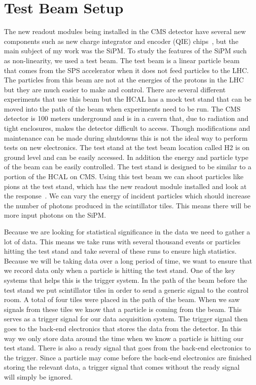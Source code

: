 \section{Test Beam Setup}


The new readout modules being installed in the CMS detector have several new components such as new charge integrator and encoder (QIE) chips~\cite{QIE, QIE2}, but the main subject of my work was the SiPM. To study the features of the SiPM such as non-linearity, we used a test beam. The test beam is a linear particle beam that comes from the SPS accelerator when it does not feed particles to the LHC. The particles from this beam are not at the energies of the protons in the LHC but they are much easier to make and control. There are several different experiments that use this beam but the HCAL has a mock test stand that can be moved into the path of the beam when experiments need to be run. The CMS detector is 100 meters underground and is in a cavern that, due to radiation and tight enclosures, makes the detector difficult to access. Though modifications and maintenance can be made during shutdowns this is not the ideal way to perform tests on new electronics. The test stand at the test beam location called H2 is on ground level and can be easily accessed. In addition the energy and particle type of the beam can be easily controlled. The test stand is designed to be similar to a portion of the HCAL on CMS. Using this test beam we can shoot particles like pions at the test stand, which has the new readout module installed and look at the response~\cite{TB96, TB06}. We can vary the energy of incident particles which should increase the number of photons produced in the scintillator tiles. This means there will be more input photons on the SiPM.

Because we are looking for statistical significance in the data we need to gather a lot of data. This means we take runs with several thousand events or particles hitting the test stand and take several of these runs to ensure high statistics. Because we will be taking data over a long period of time, we want to ensure that we record data only when a particle is hitting the test stand. One of the key systems that helps this is the trigger system. In the path of the beam before the test stand we put scintillator tiles in order to send a generic signal to the control room. A total of four tiles were placed in the path of the beam. When we saw signals from these tiles we know that a particle is coming from the beam. This serves as a trigger signal for our data acquisition system. The trigger signal then goes to the back-end electronics that stores the data from the detector. In this way we only store data around the time when we know a particle is hitting our test stand. There is also a ready signal that goes from the back-end electronics to the trigger. Since a particle may come before the back-end electronics are finished storing the relevant data, a trigger signal that comes without the ready signal will simply be ignored.

